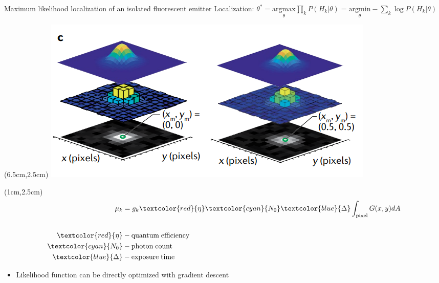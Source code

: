 \documentclass{beamer}					%
\begin{document}
\begin{frame}{Maximum likelihood localization of an isolated fluorescent emitter}
Localization: $\theta^{*} = \underset{\theta}{\mathrm{argmax}}\prod_{k}P(H_{k}|\theta)= \underset{\theta}{\mathrm{argmin}}-\sum_{k}\log P(H_{k}|\theta)$

\begin{textblock*}{8cm}(6.5cm,2.5cm)
\includegraphics[width=\textwidth]{Model.png}
\end{textblock*}

\begin{textblock*}{2cm}(1cm,2.5cm)
\begin{align*}
\mu_{k} &= g_{k}\textcolor{red}{\eta} \textcolor{cyan}{N_{0}}\textcolor{blue}{\Delta}\int_{\mathrm{pixel}} G(x,y)dA\\
\\
\textcolor{red}{\eta} &- \mathrm{quantum\; efficiency}\\
\textcolor{cyan}{N_{0}} &- \mathrm{photon\; count}\\
\textcolor{blue}{\Delta} &- \mathrm{exposure\; time}
\end{align*}
\end{textblock*}

\vspace{2in}

\begin{itemize}
\item Likelihood function can be directly optimized with gradient descent
\end{itemize} 

\end{frame}
\end{document}

